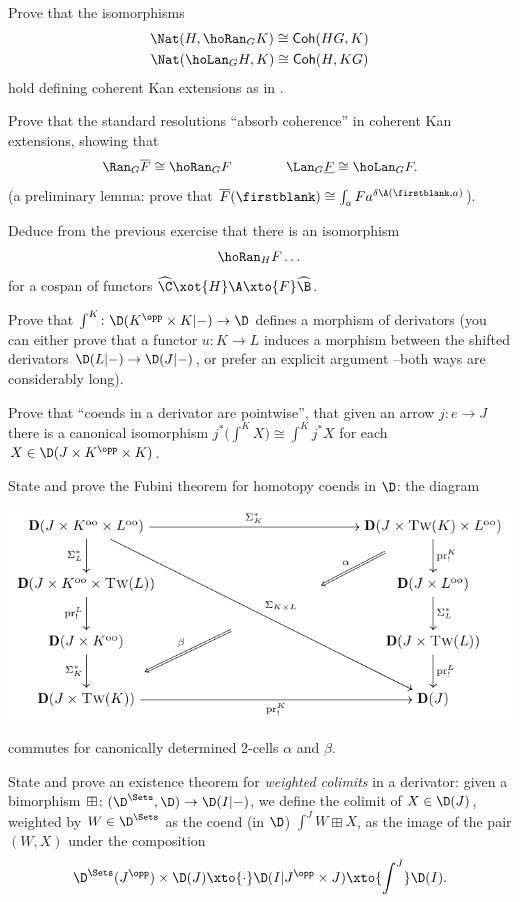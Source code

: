 \begin{exerciseset}
\begin{exercisepoints}
\item \label{ex8:cohkan} Prove that the isomorphisms
\begin{gather*}
\Nat(H,\hoRan_G K)\cong \textsf{Coh}(HG,K)\\
\Nat(\hoLan_G H,K)\cong \textsf{Coh}(H,KG)
\end{gather*}
hold defining coherent Kan extensions as in .
\item Prove that the standard resolutions ``absorb coherence'' in coherent Kan extensions, showing that
\[
\Ran_G \overline F \cong \hoRan_G F \qquad\qquad \Lan_G \underline F \cong \hoLan_G F .
\]
(a preliminary lemma: prove that $\overline F(\firstblank)\cong \int_a Fa^{\delta\A(\firstblank,a)}$).%
\item Deduce from the previous exercise that there is an isomorphism 
\[
\hoRan_HF \dots
\]
for a cospan of functors $\widehat{\C} \xot{H} \A \xto{F}\widehat{\B}$.
\item \label{ex8:derivcoend} Prove that $\int^K\colon \D(K^\opp\times K|-)\to \D$ defines a morphism of derivators (you can either prove that a functor $u\colon K\to L$ induces a morphism between the shifted derivators $\D(L|-)\to \D(J|-)$, or prefer an explicit argument --both ways are considerably long).
\item Prove that ``coends in a derivator are pointwise'', \ie that given an arrow $j\colon e\to J$ there is a canonical isomorphism $j^*\big(\int^K X\big)\cong \int^K j^*X$ for each $X\in \D(J\times K^\opp\times K)$.
\item \label{ex8:derivfubini} State and prove the Fubini theorem for homotopy coends in $\D$: the diagram 
\begin{center}
\includegraphics[scale=.75]{figures/fig11}
\end{center}
commutes for canonically determined 2-cells $\alpha$ and $\beta$.
\item \label{ex8:derivweighlim} State and prove an existence theorem for \emph{weighted colimits} in a derivator: given a bimorphism $\boxplus\colon (\D^{\Sets},\D)\to \D(I|-)$, we define the colimit of $X\in \D(J)$, weighted by $W\in \D^{\Sets}$ as the coend (in $\D$) $\int^J W\boxplus X$, \ie as the image of the pair $(W,X)$ under the composition
\[
\D^{\Sets}(J^\opp)\times \D(J) \xto{\cdot} \D(I|J^\opp\times J) \xto{\int^J}\D(I).
\]
\end{exercisepoints}
\end{exerciseset}